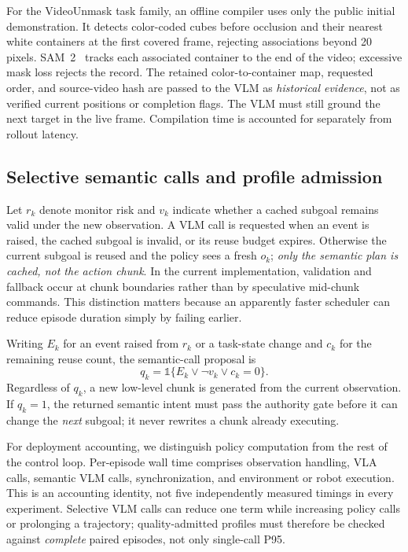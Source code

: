 \documentclass[letterpaper,10pt,conference]{ieeeconf}
\begin{document}
For the VideoUnmask task family, an offline compiler uses only the public
initial demonstration. It detects color-coded cubes before occlusion and
their nearest white containers at the first covered frame, rejecting
associations beyond 20 pixels. SAM~2~\cite{sam2} tracks each associated
container to the end of the video; excessive mask loss rejects the record.
The retained color-to-container map, requested order, and source-video hash
are passed to the VLM as \emph{historical evidence}, not as verified current
positions or completion flags. The VLM must still ground the next target in
the live frame. Compilation time is accounted for separately from rollout
latency.

\subsection{Selective semantic calls and profile admission}
Let $r_k$ denote monitor risk and $v_k$ indicate whether a cached subgoal remains valid under the new observation. A VLM call is requested when an event is raised, the cached subgoal is invalid, or its reuse budget expires. Otherwise the current subgoal is reused and the policy sees a fresh $o_k$; \emph{only the semantic plan is cached, not the action chunk}. In the current implementation, validation and fallback occur at chunk boundaries rather than by speculative mid-chunk commands. This distinction matters because an apparently faster scheduler can reduce episode duration simply by failing earlier.

Writing $E_k$ for an event raised from $r_k$ or a task-state change and $c_k$
for the remaining reuse count, the
semantic-call proposal is
\begin{equation}
 q_k=\mathbb{1}\{E_k\lor\neg v_k\lor c_k=0\}.
\end{equation}
Regardless of $q_k$, a new low-level chunk is generated from the current
observation. If $q_k=1$, the returned semantic intent must pass the authority
gate before it can change the \emph{next} subgoal; it never rewrites a chunk
already executing.

For deployment accounting, we distinguish policy computation from the rest
of the control loop. Per-episode wall time comprises observation handling,
VLA calls, semantic VLM calls, synchronization, and environment or robot
execution. This is an accounting identity, not five independently measured
timings in every experiment. Selective VLM calls can reduce one term while
increasing policy calls or prolonging a trajectory; quality-admitted profiles
must therefore be checked against \emph{complete} paired episodes, not only
single-call P95.
\end{document}
